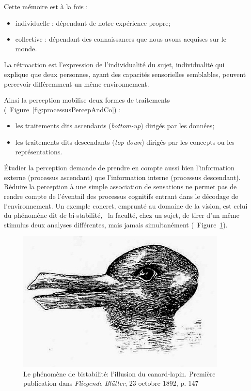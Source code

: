 Cette mémoire est à la fois :

\begin{itemize}
\item individuelle : dépendant de notre expérience propre;
\item collective : dépendant des connaissances que nous avons acquises sur le monde.
\end{itemize}

La rétroaction est l'expression de l'individualité du sujet, individualité qui explique que deux personnes, ayant des capacités sensorielles semblables, peuvent percevoir différemment un même environnement.

Ainsi la perception mobilise deux formes de traitements (\cf~Figure~\ref{fig:processusPercepAndCo}) :

\begin{itemize}
\item les traitements dits ascendants (\emph{bottom-up}) dirigés par les données;
\item les traitements dits descendants (\emph{top-down}) dirigés par les concepts ou les représentations.
\end{itemize}

Étudier la perception demande de prendre en compte aussi bien l'information externe (processus ascendant) que l'information interne (processus descendant). Réduire la perception à une simple association de sensations ne permet pas de rendre compte de l'éventail des processus cognitifs entrant dans le décodage de l'environnement. Un exemple concret, emprunté au domaine de la vision, est celui du phénomène dit de bi-stabilité, \ie~la faculté, chez un sujet, de tirer d'un même stimulus deux analyses différentes, mais jamais simultanément \citep{schwartz2012multistability} (\cf~Figure~\ref{fig:bistabilite}). \\

\begin{figure}[t]
        \myfloatalign
        \includegraphics[width=.6\linewidth]{gfx/canard_lapin}
        \caption[Le phénomène de bistabilité: l'illusion du canard-lapin]{Le phénomène de bistabilité: l'illusion du canard-lapin. Première publication dans \emph{Fliegende Blätter}, 23 octobre 1892, p. 147}\label{fig:bistabilite}
\end{figure}

